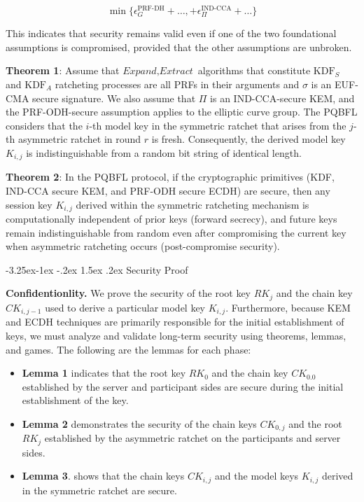 \documentclass[a4paper,fleqn]{cas-dc}
\makeatletter
\renewcommand\subsection{\@startsection{subsection}{2}{\z@}%
   {-3.25ex\@plus -1ex \@minus -.2ex}%
   {1.5ex \@plus .2ex}%
   {\normalfont\large}} %
\makeatother
\begin{document}
$$
    \min \{ \epsilon_{G}^{\text{PRF-DH}} + \ldots, + \epsilon_{\Pi}^{\text{IND-CCA}} + \ldots \}
$$

This indicates that security remains valid even if one of the two foundational assumptions is compromised, provided that the other assumptions are unbroken.

\textbf{Theorem 1}:
Assume that $\textit{Expand}, \textit{Extract}$ algorithms that constitute $\text{KDF}_{S}$ and $\text{KDF}_{A}$ ratcheting processes are all PRFs in their arguments and $\sigma$ is an EUF-CMA secure signature.  
We also assume that $\Pi$ is an IND-CCA-secure KEM, and the PRF-ODH-secure assumption applies to the elliptic curve group.    
The PQBFL considers that the $i$-th model key in the symmetric ratchet that arises from the $j$-th asymmetric ratchet in round $r$ is fresh. Consequently, the derived model key $K_{i,j}$ is indistinguishable from a random bit string of identical length.

\textbf{Theorem 2}:
In the PQBFL protocol, if the cryptographic primitives (KDF, IND-CCA secure KEM, and PRF-ODH secure ECDH) are secure, then any session key $K_{i,j}$ derived within the symmetric ratcheting mechanism is computationally independent of prior keys (forward secrecy), and future keys remain indistinguishable from random even after compromising the current key when asymmetric ratcheting occurs (post-compromise security).

\subsection{Security Proof} 

\noindent\textbf{Confidentionlity.} 
We prove the security of the root key $RK_{j}$ and the chain key $CK_{i,j-1}$ used to derive a particular model key $K_{i,j}$.
Furthermore, because KEM and ECDH techniques are primarily responsible for the initial establishment of keys, we must analyze and validate long-term security using theorems, lemmas, and games. 
The following are the lemmas for each phase:

\begin{itemize}
    \item \textbf{Lemma 1} indicates that the root key $RK_{0}$ and the chain key $CK_{0.0}$ established by the server and participant sides are secure during the initial establishment of the key. 
    \item \textbf{Lemma 2} demonstrates the security of the chain keys $CK_{0,j}$ and the root $RK_{j}$ established by the asymmetric ratchet on the participants and server sides.
    \item \textbf{Lemma 3}. shows that the chain keys $CK_{i,j}$ and the model keys $K_{i,j}$ derived in the symmetric ratchet are secure.
\end{itemize}
\end{document}
